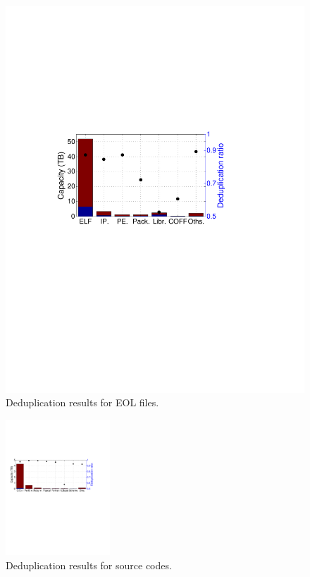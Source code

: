 \begin{figure}[t]
\begin{minipage}{0.22\textwidth}
		\includegraphics[width=1\textwidth]{graphs/dedup-eol}
		\caption{Deduplication results for EOL files.}
		\label{fig:dedup-eol}
	\end{minipage}%
\end{figure}

%

\begin{figure}
	\centering
	\includegraphics[width=0.35\textwidth]{graphs/dedup-sc}
	\caption{Deduplication results for source codes.
	}
	\label{fig:dedup-sc}
\end{figure}

